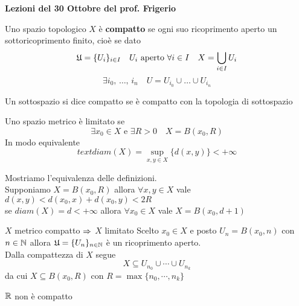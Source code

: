  

\textbf{Lezioni del 30  Ottobre del prof. Frigerio}
\begin{defn}[Compatto]\bianco
Uno spazio topologico $X$ \`e \textbf{compatto} se ogni suo ricoprimento aperto un sottoricoprimento finito, cio\`e se dato 
$$ \mathfrak{U} =\{ U_i \}_{i \in I} \quad U_i \text{ aperto } \forall i \in I \quad X = \bigcup_{i \in I} U_i $$
$$ \exists i_0, \, \dots , \, i_n \quad U = U_{i_0} \cup \dots \cup U_{i_n}$$
\end{defn}
\begin{defn}Un sottospazio si dice compatto se \`e compatto con la topologia di sottospazio
\end{defn}
\begin{defn}Uno spazio metrico \`e limitato se $$\exists x_0 \in X \text{ e } \exists R >0 \quad X=B(x_0,R)$$
In modo equivalente 
$$ text{diam}(X) = \sup_{x,y \in X} \{ d( x,y)\} < + \infty$$
\begin{oss}Mostriamo l'equivalenza delle definizioni.\\
Supponiamo $X=B(x_0,R) $ allora $ \forall x ,y \in X$  vale $d(x,y) < d(x_0,x)+d(x_0,y)<2R$\\
se $diam(X)=d<+\infty$ allora $\forall x_0 \in X$ vale $X=B(x_0,d+1)$
\end{oss}
\end{defn}
\spazio
\begin{lem}$X$ metrico compatto $\Rightarrow$ $X$ limitato
\proof Scelto $x_0 \in X $ e posto $U_n =B(x_0,n)$ con $n\in \mathbb{N}$ allora $\displaystyle \mathfrak{U} =\{ U_n \}_{n\in \mathbb{N}}$ \`e un ricoprimento aperto.\\
Dalla compattezza di $X$ segue
$$ X \subseteq U_{n_0} \cup \cdots \cup U_{n_k}$$
da cui $X  \subseteq B(x_0,R)$ con $R=\max \{ n_0, \cdots , n_k \}$
\endproof
\end{lem}
\begin{cor}$\mathbb{R}$ non \`e compatto
\end{cor}
\spazio 
